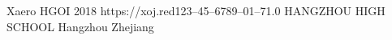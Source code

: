 \documentclass{xaerobook}
\begin{document}
       {Xaero}
       {HGOI}
       {2018}
       {https://xoj.red}{123--45--6789--01--7}{1.0}
       {HANGZHOU HIGH SCHOOL}
       {Hangzhou Zhejiang}











\end{document}
